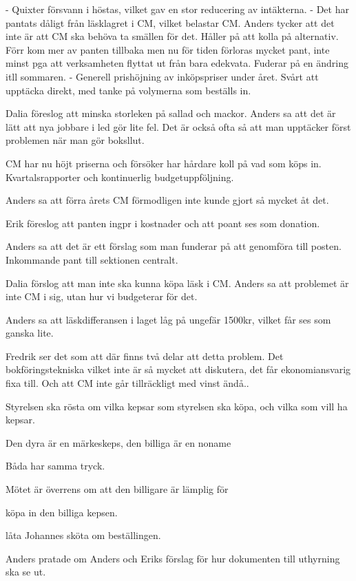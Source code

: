 \documentclass[10pt]{article}
\begin{document}
\begin{paragrafer}
- Quixter försvann i höstas, vilket gav en stor reducering av intäkterna.
- Det har pantats dåligt från läsklagret i CM, vilket belastar CM. Anders tycker att det inte är att CM ska behöva ta smällen för det. Håller på att kolla på alternativ. Förr kom mer av panten tillbaka men nu för tiden förloras mycket pant, inte minst pga att verksamheten flyttat ut från bara edekvata. Fuderar på en ändring itll sommaren.
- Generell prishöjning av inköpspriser under året. Svårt att upptäcka direkt, med tanke på volymerna som beställs in.

Dalia föreslog att minska storleken på sallad och mackor. Anders sa att det är lätt att nya jobbare i led gör lite fel. Det är också ofta så att man upptäcker först problemen när man gör boksllut.

CM har nu höjt priserna och försöker har hårdare koll på vad som köps in. Kvartalsrapporter och kontinuerlig budgetuppföljning.

Anders sa att förra årets CM förmodligen inte kunde gjort så mycket åt det.

Erik föreslog att panten ingpr i kostnader och att poant ses som donation.

Anders sa att det är ett förslag som man funderar på att genomföra till posten. Inkommande pant till sektionen centralt.

Dalia förslog att man inte ska kunna köpa läsk i CM. Anders sa att problemet är inte CM i sig, utan hur vi budgeterar för det.

Anders sa att läskdifferansen i laget låg på ungefär 1500kr, vilket får ses som ganska lite.

Fredrik ser det som att där finns två delar att detta problem. Det bokföringstekniska vilket inte är så mycket att diskutera, det får ekonomiansvarig fixa till. Och att CM inte går tillräckligt med vinst ändå.. %

Styrelsen ska rösta om vilka kepsar som styrelsen ska köpa, och vilka som vill ha kepsar.

Den dyra är en märkeskeps, den billiga är en noname

Båda har samma tryck.

Mötet är överrens om att den billigare är lämplig för

\Mba köpa in den billiga kepsen.

\Mba låta Johannes sköta om beställingen.

Anders pratade om Anders och Eriks förslag för hur dokumenten till uthyrning ska se ut.


\end{paragrafer}
\end{document}
